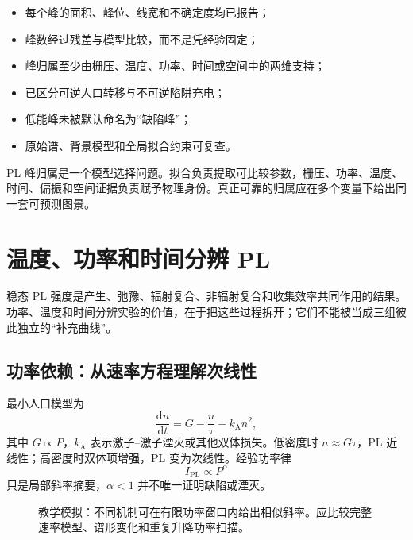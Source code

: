 \documentclass[11pt,a4paper,openany,fontset=fandol]{ctexbook}
\newcommand{\tickitem}{\item[$\square$]}
\newcommand{\dd}{\mathrm{d}}
\begin{document}
\begin{checkbox}
\begin{itemize}
\tickitem 每个峰的面积、峰位、线宽和不确定度均已报告；
\tickitem 峰数经过残差与模型比较，而不是凭经验固定；
\tickitem 峰归属至少由栅压、温度、功率、时间或空间中的两维支持；
\tickitem 已区分可逆人口转移与不可逆陷阱充电；
\tickitem 低能峰未被默认命名为“缺陷峰”；
\tickitem 原始谱、背景模型和全局拟合约束可复查。
\end{itemize}
\end{checkbox}

\begin{conclusionbox}
PL 峰归属是一个模型选择问题。拟合负责提取可比较参数，栅压、功率、温度、时间、偏振和空间证据负责赋予物理身份。真正可靠的归属应在多个变量下给出同一套可预测图景。
\end{conclusionbox}

\chapter{温度、功率和时间分辨 PL}

稳态 PL 强度是产生、弛豫、辐射复合、非辐射复合和收集效率共同作用的结果。功率、温度和时间分辨实验的价值，在于把这些过程拆开；它们不能被当成三组彼此独立的“补充曲线”。

\section{功率依赖：从速率方程理解次线性}

最小人口模型为
\[
\frac{\dd n}{\dd t}=G-\frac{n}{\tau}-k_{\mathrm A}n^2,
\]
其中 $G\propto P$，$k_{\mathrm A}$ 表示激子--激子湮灭或其他双体损失。低密度时 $n\approx G\tau$，PL 近线性；高密度时双体项增强，PL 变为次线性。经验功率律
\[
I_{\mathrm{PL}}\propto P^{\alpha}
\]
只是局部斜率摘要，$\alpha<1$ 并不唯一证明缺陷或湮灭。

\begin{figure}[H]
\centering
{}
\caption{教学模拟：不同机制可在有限功率窗口内给出相似斜率。应比较完整速率模型、谱形变化和重复升降功率扫描。}
\end{figure}
\end{document}
